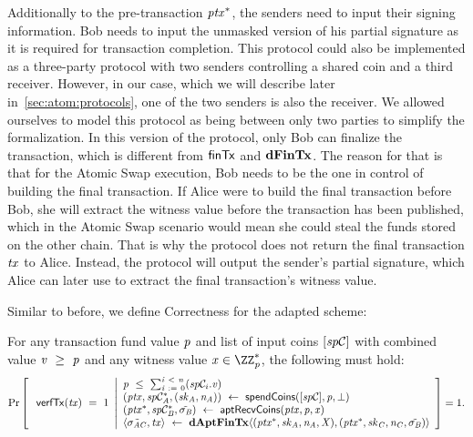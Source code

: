 \begin{definition}
\begin{itemize}
        Additionally to the pre-transaction $\mathit{ptx}^*$, the senders need to input their signing information.
        Bob needs to input the unmasked version of his partial signature as it is required for transaction completion.
        This protocol could also be implemented as a three-party protocol with two senders controlling a shared coin and a third receiver.
        However, in our case, which we will describe later in~\cref{sec:atom:protocols}, one of the two senders is also the receiver.
        We allowed ourselves to model this protocol as being between only two parties to simplify the formalization.
        In this version of the protocol, only Bob can finalize the transaction, which is different from $\mathsf{finTx}$ and $\mathbf{dFinTx}$.
        The reason for that is that for the Atomic Swap execution, Bob needs to be the one in control of building the final transaction.
        If Alice were to build the final transaction before Bob, she will extract the witness value before the transaction has been published, which in the Atomic Swap scenario would mean she could steal the funds stored on the other chain.
        That is why the protocol does not return the final transaction $\mathit{tx}$ to Alice.
        Instead, the protocol will output the sender's partial signature, which Alice can later use to extract the final transaction's witness value.
    \end{itemize}
\end{definition}

Similar to before, we define Correctness for the adapted scheme:

\begin{definition}
    \label{def:atom:apt-tx-scheme-correctness}
    For any transaction fund value $\mathit{p}$ and list of input coins $[\mathit{sp}\mathcal{C}]$ with combined value $\mathit{v} ~\geq~ \mathit{p}$ and any witness value $\varX \opIn \cnstIntegersPrimeWithoutZero{\varPrime}$, the following must hold:
    \[
        \Pr\left[
        \begin{array}{c}
            \: \mathsf{verfTx}(\mathit{tx}) ~=~ 1
        \end{array}
        \middle\vert
        \begin{array}{l}
            \mathit{p} ~\leq~ \sum_{\mathit{i} ~:=~ 0}^{\mathit{i} ~<~ \mathit{n}}(\mathit{sp}\mathcal{C}_{i}.\mathit{v}) \\
            (\mathit{ptx}, \mathit{sp}\mathcal{C}_{\mathit{A}}^*, (\mathit{sk}_{\mathit{A}}, \mathit{\mathit{n}_{\mathit{A}}})) ~\leftarrow~ \mathsf{spendCoins}([\mathit{sp}\mathcal{C}],\mathit{p},\bot) \\
            (\mathit{ptx}^*, \mathit{sp}\mathcal{C}_{\mathit{B}}^*, \tilde{\sigma_{\mathit{B}}}) ~\leftarrow~ \mathsf{aptRecvCoins}(\mathit{ptx},\mathit{p},\mathit{x}) \\
            \langle \tilde{\sigma_{\mathit{A}\mathit{C}}}, \mathit{tx} \rangle ~\leftarrow~ \mathbf{dAptFinTx} \langle (\mathit{ptx}^*,\mathit{sk}_{\mathit{A}},\mathit{\mathit{n}_{\mathit{A}}},\mathit{X}), (\mathit{ptx}^*,\mathit{sk}_{\mathit{C}},\mathit{\mathit{n}_{\mathit{C}}},\tilde{\sigma_{\mathit{B}}}) \rangle
        \end{array}
        \right]=1.
    \]
\end{definition}
